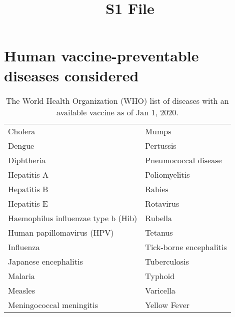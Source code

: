 \documentclass[10pt,a4paper]{article}
\title{S1 File }
\begin{document}
\maketitle

\section{Human vaccine-preventable diseases considered}	

\begin{table}[H]
	\centering
	\caption{The World Health Organization (WHO) list of diseases with an available vaccine as of Jan 1, 2020.}
	\begin{tabular}{ll}
		\toprule
		Cholera	& Mumps \\
		Dengue	&  Pertussis\\
		Diphtheria	& Pneumococcal disease \\
		Hepatitis A		&  Poliomyelitis\\
		Hepatitis B		& Rabies \\
		Hepatitis E	& 	Rotavirus \\
		Haemophilus influenzae type b (Hib)		& Rubella \\
		Human papillomavirus (HPV)	&  	Tetanus\\
		Influenza	&  Tick-borne encephalitis	\\
		Japanese encephalitis		&  Tuberculosis\\
		Malaria		&  Typhoid\\
		Measles		& Varicella \\
		Meningococcal meningitis		&  Yellow Fever\\
		\bottomrule
	\end{tabular}
	\label{chap2-table: The World Health Organization (WHO) list of diseases with an available vaccine}
\end{table}
	
\end{document}
